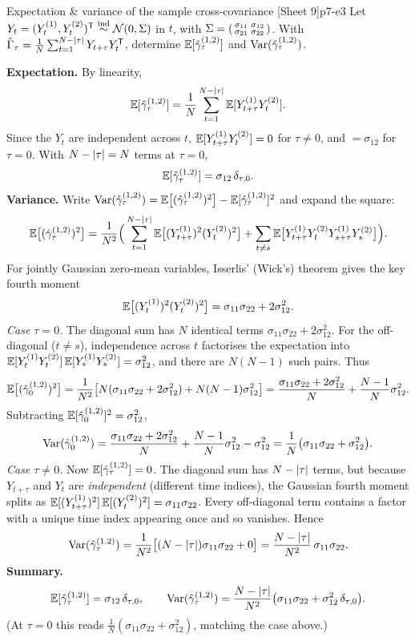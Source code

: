 \begin{exercise}{Expectation \& variance of the sample cross-covariance \quad\textnormal{[Sheet 9]}}{p7-e3}
Let $Y_t=(Y_t^{(1)},Y_t^{(2)})^{\mathsf{T}}\overset{\text{ind}}{\sim}\mathcal N(0,\Sigma)$
in $t$, with $\Sigma=\begin{psmallmatrix}\sigma_{11}&\sigma_{12}\\
\sigma_{21}&\sigma_{22}\end{psmallmatrix}$. With
$\hat\Gamma_\tau=\frac1N\sum_{t=1}^{N-\left\lvert \tau \right\rvert}Y_{t+\tau}Y_t^{\mathsf{T}}$, determine
$\mathbb{E}[\hat{\gamma}_\tau^{(1,2)}]$ and $\operatorname{Var}(\hat{\gamma}_\tau^{(1,2)})$.
\end{exercise}
\begin{solution}
\textbf{Expectation.} By linearity,
\[
\mathbb{E}[\hat{\gamma}_\tau^{(1,2)}]=\frac1N\sum_{t=1}^{N-\left\lvert \tau \right\rvert}\mathbb{E}[Y_{t+\tau}^{(1)}Y_t^{(2)}].
\]
Since the $Y_t$ are independent across $t$, $\mathbb{E}[Y_{t+\tau}^{(1)}Y_t^{(2)}]=0$ for
$\tau\ne0$, and $=\sigma_{12}$ for $\tau=0$. With $N-\left\lvert \tau \right\rvert=N$ terms at
$\tau=0$,
\[
\mathbb{E}[\hat{\gamma}_\tau^{(1,2)}]=\sigma_{12}\,\delta_{\tau,0}.
\]
\textbf{Variance.} Write
$\operatorname{Var}(\hat{\gamma}_\tau^{(1,2)})=\mathbb{E}\big[(\hat{\gamma}_\tau^{(1,2)})^2\big]-\mathbb{E}[\hat{\gamma}_\tau^{(1,2)}]^2$
and expand the square:
\[
\mathbb{E}\big[(\hat{\gamma}_\tau^{(1,2)})^2\big]
=\frac{1}{N^2}\Big(\sum_{t=1}^{N-\left\lvert \tau \right\rvert}\mathbb{E}\big[(Y_{t+\tau}^{(1)})^2(Y_t^{(2)})^2\big]
+\sum_{t\ne s}\mathbb{E}\big[Y_{t+\tau}^{(1)}Y_t^{(2)}Y_{s+\tau}^{(1)}Y_s^{(2)}\big]\Big).
\]
For jointly Gaussian zero-mean variables, Isserlis' (Wick's) theorem gives the
key fourth moment
\[
\mathbb{E}\big[(Y_t^{(1)})^2(Y_t^{(2)})^2\big]=\sigma_{11}\sigma_{22}+2\sigma_{12}^2 .
\]
\emph{Case $\tau=0$.} The diagonal sum has $N$ identical terms
$\sigma_{11}\sigma_{22}+2\sigma_{12}^2$. For the off-diagonal ($t\ne s$),
independence across $t$ factorises the expectation into
$\mathbb{E}[Y_t^{(1)}Y_t^{(2)}]\,\mathbb{E}[Y_s^{(1)}Y_s^{(2)}]=\sigma_{12}^2$, and there are
$N(N-1)$ such pairs. Thus
\[
\mathbb{E}\big[(\hat{\gamma}_0^{(1,2)})^2\big]
=\frac1{N^2}\big[N(\sigma_{11}\sigma_{22}+2\sigma_{12}^2)+N(N-1)\sigma_{12}^2\big]
=\frac{\sigma_{11}\sigma_{22}+2\sigma_{12}^2}{N}+\frac{N-1}{N}\sigma_{12}^2 .
\]
Subtracting $\mathbb{E}[\hat{\gamma}_0^{(1,2)}]^2=\sigma_{12}^2$,
\[
\operatorname{Var}(\hat{\gamma}_0^{(1,2)})
=\frac{\sigma_{11}\sigma_{22}+2\sigma_{12}^2}{N}+\frac{N-1}{N}\sigma_{12}^2-\sigma_{12}^2
=\frac{1}{N}\big(\sigma_{11}\sigma_{22}+\sigma_{12}^2\big).
\]
\emph{Case $\tau\ne0$.} Now $\mathbb{E}[\hat{\gamma}_\tau^{(1,2)}]=0$. The diagonal sum has
$N-\left\lvert \tau \right\rvert$ terms, but because $Y_{t+\tau}$ and $Y_t$ are \emph{independent}
(different time indices), the Gaussian fourth moment splits as
$\mathbb{E}[(Y_{t+\tau}^{(1)})^2]\,\mathbb{E}[(Y_t^{(2)})^2]=\sigma_{11}\sigma_{22}$. Every
off-diagonal term contains a factor with a unique time index appearing once and
so vanishes. Hence
\[
\operatorname{Var}(\hat{\gamma}_\tau^{(1,2)})
=\frac{1}{N^2}\big[(N-\left\lvert \tau \right\rvert)\sigma_{11}\sigma_{22}+0\big]
=\frac{N-\left\lvert \tau \right\rvert}{N^2}\,\sigma_{11}\sigma_{22}.
\]
\textbf{Summary.}
\[
\mathbb{E}[\hat{\gamma}_\tau^{(1,2)}]=\sigma_{12}\,\delta_{\tau,0},\qquad
\operatorname{Var}(\hat{\gamma}_\tau^{(1,2)})=\frac{N-\left\lvert \tau \right\rvert}{N^2}\big(\sigma_{11}\sigma_{22}+\sigma_{12}^2\,\delta_{\tau,0}\big).
\]
(At $\tau=0$ this reads $\tfrac1N(\sigma_{11}\sigma_{22}+\sigma_{12}^2)$,
matching the case above.)
\end{solution}

